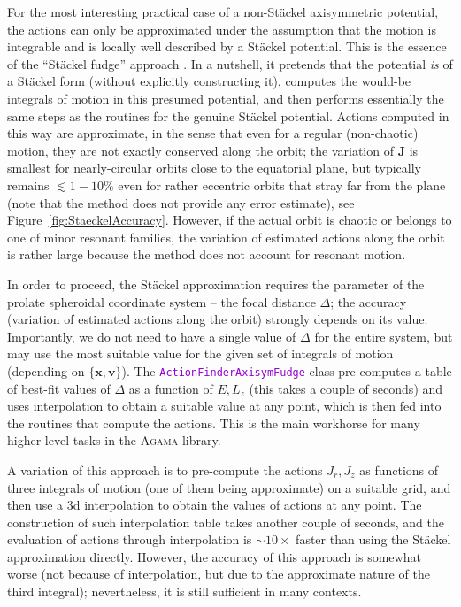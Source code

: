\documentclass[12pt]{article}
\newcommand{\Agama}{\textsc{Agama}\xspace}
\newcommand{\ttt}[1]{\textcolor{darkviolet}{\texttt{#1}}}
\newcommand{\bv}{\boldsymbol{v}}
\newcommand{\bx}{\boldsymbol{x}}
\newcommand{\bJ}{\boldsymbol{J}}
\begin{document}
For the most interesting practical case of a non-St\"ackel axisymmetric potential, the actions can only be approximated under the assumption that the motion is integrable and is locally well described by a St\"ackel potential. This is the essence of the ``St\"ackel fudge'' approach \cite{Binney2012}. In a nutshell, it pretends that the potential \textit{is} of a St\"ackel form (without explicitly constructing it), computes the would-be integrals of motion in this presumed potential, and then performs essentially the same steps as the routines for the genuine St\"ackel potential. Actions computed in this way are approximate, in the sense that even for a regular (non-chaotic) motion, they are not exactly conserved along the orbit; the variation of $\bJ$ is smallest for nearly-circular orbits close to the equatorial plane, but typically remains $\lesssim 1-10\%$ even for rather eccentric orbits that stray far from the plane (note that the method does not provide any error estimate), see Figure~\ref{fig:StaeckelAccuracy}. However, if the actual orbit is chaotic or belongs to one of minor resonant families, the variation of estimated actions along the orbit is rather large because the method does not account for resonant motion.

In order to proceed, the St\"ackel approximation requires the parameter of the prolate spheroidal coordinate system -- the focal distance $\Delta$; the accuracy (variation of estimated actions along the orbit) strongly depends on its value. Importantly, we do not need to have a single value of $\Delta$ for the entire system, but may use the most suitable value for the given set of integrals of motion (depending on $\{\bx,\bv\}$).
The \ttt{ActionFinderAxisymFudge} class pre-computes a table of best-fit values of $\Delta$ as a function of $E,L_z$ (this takes a couple of seconds) and uses interpolation to obtain a suitable value at any point, which is then fed into the routines that compute the actions.
This is the main workhorse for many higher-level tasks in the \Agama library.

A variation of this approach is to pre-compute the actions $J_r,J_z$ as functions of three integrals of motion (one of them being approximate) on a suitable grid, and then use a 3d interpolation to obtain the values of actions at any point. The construction of such interpolation table takes another couple of seconds, and the evaluation of actions through interpolation is $\sim 10\times$ faster than using the St\"ackel approximation directly. However, the accuracy of this approach is somewhat worse (not because of interpolation, but due to the approximate nature of the third integral); nevertheless, it is still sufficient in many contexts.
\end{document}
